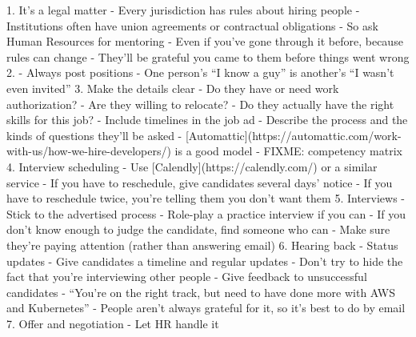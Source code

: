 \documentclass[10pt,letterpaper]{article}
\begin{document}
1. It's a legal matter
   - Every jurisdiction has rules about hiring people
   - Institutions often have union agreements or contractual obligations
   - So ask Human Resources for mentoring
     - Even if you've gone through it before, because rules can change
   - They'll be grateful you came to them before things went wrong
2. - Always post positions
   - One person's ``I know a guy'' is another's ``I wasn't even invited''
3. Make the details clear
   - Do they have or need work authorization?
   - Are they willing to relocate?
   - Do they actually have the right skills for this job?
   - Include timelines in the job ad
   - Describe the process and the kinds of questions they'll be asked
     - [Automattic](https://automattic.com/work-with-us/how-we-hire-developers/) is a good model
   - FIXME: competency matrix
4. Interview scheduling
   - Use [Calendly](https://calendly.com/) or a similar service
   - If you have to reschedule, give candidates several days' notice
     - If you have to reschedule twice, you're telling them you don't want them
5. Interviews
   - Stick to the advertised process
     - Role-play a practice interview if you can
   - If you don't know enough to judge the candidate, find someone who can
   - Make sure they're paying attention (rather than answering email)
6. Hearing back
   - Status updates
     - Give candidates a timeline and regular updates
     - Don't try to hide the fact that you're interviewing other people
   - Give feedback to unsuccessful candidates
     - ``You're on the right track, but need to have done more with AWS and Kubernetes''
     - People aren't always grateful for it, so it's best to do by email
7. Offer and negotiation
   - Let HR handle it
\end{document}
